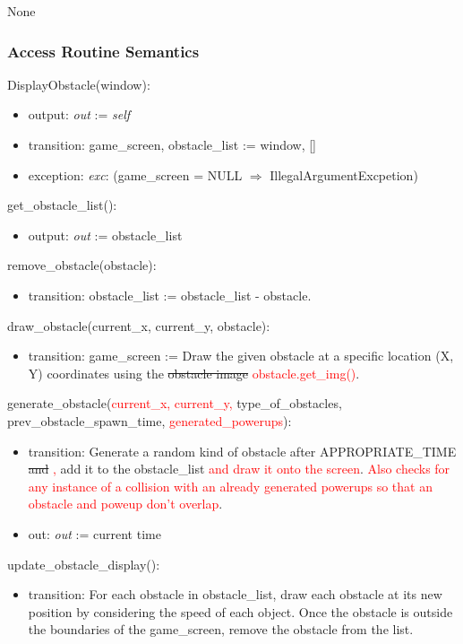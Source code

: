 \documentclass[12pt]{article}
\begin{document}
None

\subsubsection* {Access Routine Semantics}

   DisplayObstacle(window):
\begin{itemize}
    \item output: \textit{out} := \textit{self}
    \item transition: game\_screen, obstacle\_list := window, []
    \item exception: \textit{exc}: (game\_screen = NULL $\Rightarrow$ IllegalArgumentExcpetion)
\end{itemize}
\noindent get\_obstacle\_list():
\begin{itemize}
    \item output: \textit{out} := obstacle\_list
\end{itemize}
\noindent remove\_obstacle(obstacle): 
\begin{itemize}
    \item transition: obstacle\_list := obstacle\_list - obstacle.
\end{itemize}
\noindent draw\_obstacle(current\_x, current\_y, obstacle): 
\begin{itemize}
    \item transition: game\_screen := Draw the given obstacle at a specific location (X, Y) coordinates using the \sout{obstacle image} \textcolor{red}{obstacle.get\_img()}.
\end{itemize}
\noindent generate\_obstacle(\textcolor{red}{current\_x, current\_y, }type\_of\_obstacles, prev\_obstacle\_spawn\_time, \textcolor{red}{generated\_powerups}):
\begin{itemize}
    \item transition: Generate a random kind of obstacle after APPROPRIATE\_TIME \sout{and} \textcolor{red}{,} add it to the obstacle\_list \textcolor{red}{ and draw it onto the screen}. \textcolor{red}{Also checks for any instance of a collision with an already generated powerups so that an obstacle and poweup don't overlap}.
    \item out: \textit{out} := current time
\end{itemize}
\noindent update\_obstacle\_display(): 
\begin{itemize}
    \item transition: For each obstacle in obstacle\_list, draw each obstacle at its new position by considering the speed of each object. Once the obstacle is outside the boundaries of the game\_screen, remove the obstacle from the list.
\end{itemize}
\end{document}
